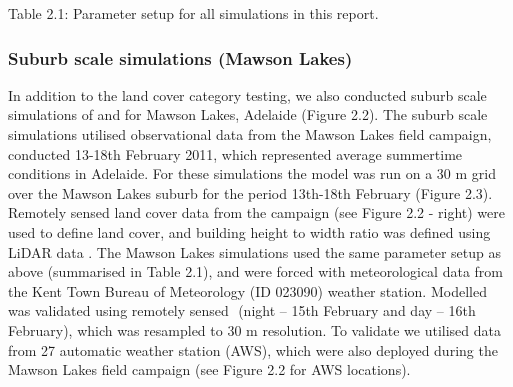 \documentclass[final,3p,times,authoryear]{elsarticle}
\begin{document}
Table 2.1: Parameter setup for all  simulations in this report.
%
%
%
%
%
%
%
%
%
%

\subsubsection{Suburb scale simulations (Mawson Lakes)}\label{sec:suburbsim} 
 
In addition to the land cover category testing, we also conducted suburb scale simulations of  and  for Mawson Lakes, Adelaide (Figure 2.2). The suburb scale simulations utilised observational data from the Mawson Lakes field campaign, conducted 13-18th February 2011, which represented average summertime conditions in Adelaide. For these simulations the model was run on a 30 m grid over the Mawson Lakes suburb for the period 13th-18th February (Figure 2.3).  Remotely sensed land cover data from the campaign (see Figure 2.2 - right) were used to define land cover, and building height to width ratio was defined using LiDAR data \citep{Broadbent2016}. The Mawson Lakes simulations used the same parameter setup as above (summarised in Table 2.1), and were forced with meteorological data from the Kent Town Bureau of Meteorology (ID 023090) weather station. Modelled  was validated using remotely sensed ­ (night – 15th February and day – 16th February), which was resampled to 30 m resolution. T­o validate  we utilised data from 27 automatic weather station (AWS), which were also deployed during the Mawson Lakes field campaign (see Figure 2.2 for AWS locations). 
 
\end{document}
